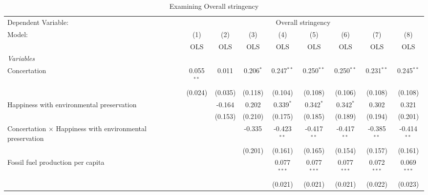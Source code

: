 
\begin{table}[htbp]
   \caption{Examining Overall stringency}
   \centering
   \begin{tabular}{lcccccccc}
      \toprule
      Dependent Variable: & \multicolumn{8}{c}{Overall stringency}\\
      Model:                                                           & (1)          & (2)     & (3)         & (4)           & (5)           & (6)           & (7)           & (8)\\  
                                                                       &  OLS         & OLS     & OLS         & OLS           & OLS           & OLS           & OLS           & OLS\\  
      \midrule
      \emph{Variables}\\
      Concertation                                                     & 0.055$^{**}$ & 0.011   & 0.206$^{*}$ & 0.247$^{**}$  & 0.250$^{**}$  & 0.250$^{**}$  & 0.231$^{**}$  & 0.245$^{**}$\\   
                                                                       & (0.024)      & (0.035) & (0.118)     & (0.104)       & (0.108)       & (0.106)       & (0.108)       & (0.108)\\   
      Happiness with environmental preservation                        &              & -0.164  & 0.202       & 0.339$^{*}$   & 0.342$^{*}$   & 0.342$^{*}$   & 0.302         & 0.321\\   
                                                                       &              & (0.153) & (0.210)     & (0.175)       & (0.185)       & (0.189)       & (0.194)       & (0.201)\\   
      Concertation $\times$ Happiness with environmental preservation  &              &         & -0.335      & -0.423$^{**}$ & -0.417$^{**}$ & -0.417$^{**}$ & -0.385$^{**}$ & -0.414$^{**}$\\   
                                                                       &              &         & (0.201)     & (0.161)       & (0.165)       & (0.154)       & (0.157)       & (0.161)\\   
      Fossil fuel production per capita                                &              &         &             & 0.077$^{***}$ & 0.077$^{***}$ & 0.077$^{***}$ & 0.072$^{***}$ & 0.069$^{***}$\\   
                                                                       &              &         &             & (0.021)       & (0.021)       & (0.021)       & (0.022)       & (0.023)\\   

\end{tabular}
\end{table}
